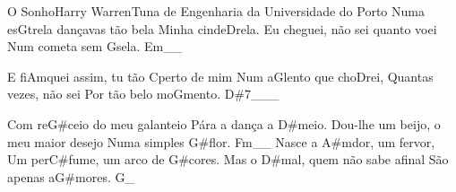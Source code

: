 \begin{musica}{O Sonho}{Harry Warren}{Tuna de Engenharia da Universidade do Porto}
Numa es\ac{G}{tre}la dançavas tão bela
Minha cinde\ac{D}{re}la.
Eu cheguei, não sei quanto voei
Num cometa sem \ac{G}{se}la. \ac{Em}{}__

E fi\ac{Am}{quei} assim, tu tão \ac{C}{per}to de mim
Num a\ac{G}{len}to que cho\ac{D}{rei},
Quantas vezes, não sei
Por tão belo mo\ac{G}{men}to. \ac{D#7}{}___

Com re\ac{G#}{ceio} do meu galanteio
Pára a dança a \ac{D#}{meio}.
Dou-lhe um beijo, o meu maior desejo
Numa simples \ac{G#}{flor}. \ac{Fm}{}__
Nasce a \ac{A#m}{dor}, um fervor,
Um per\ac{C#}{fu}me, um arco de \ac{G#}{co}res.
Mas o \ac{D#}{mal}, quem não sabe afinal
São apenas a\ac{G#}{mo}res. \ac{G}{}_

\end{musica}
